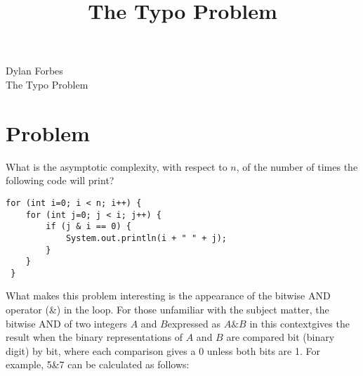 \documentclass[a4paper]{article}
\title{The Typo Problem}
\begin{document}
\begin{center}
Dylan Forbes\\
The Typo Problem
\end{center}
\section{Problem}
What is the asymptotic complexity, with respect to $n$, of the number of times the following code will print?
\begin{lstlisting}[frame=single]
for (int i=0; i < n; i++) {
	for (int j=0; j < i; j++) {
		if (j & i == 0) {
			System.out.println(i + " " + j);
		}
	}
 }
\end{lstlisting}

What makes this problem interesting is the appearance of the bitwise AND operator (\&) in the loop. For those unfamiliar with the subject matter, the bitwise AND of two integers $A$ and $B$\textemdash expressed as $A\&B$ in this context\textemdash gives the result when the binary representations of $A$ and $B$ are compared bit (binary digit) by bit, where each comparison gives a 0 unless both bits are 1. For example, 5\&7 can be calculated as follows:\\
\end{document}
